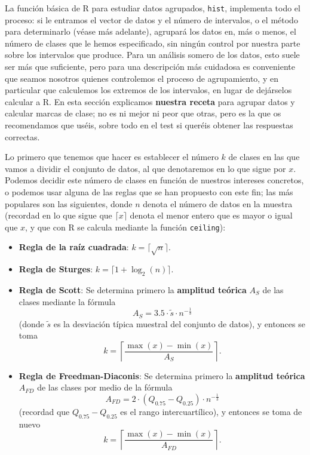 \documentclass[]{book}
\theoremstyle{definition}
\theoremstyle{definition}
\theoremstyle{definition}
\theoremstyle{remark}
\begin{document}
La función básica de R para estudiar datos agrupados, \texttt{hist}, implementa todo el proceso: si le entramos el vector de datos y el número de intervalos, o el método para determinarlo (véase más adelante), agrupará los datos en, más o menos, el número de clases que le hemos especificado, sin ningún control por nuestra parte sobre los intervalos que produce. Para un análisis somero de los datos, esto suele ser más que suficiente, pero para una descripción más cuidadosa es conveniente que seamos nosotros quienes controlemos el proceso de agrupamiento, y en particular que calculemos los extremos de los intervalos, en lugar de dejárselos calcular a R.
En esta sección explicamos \textbf{nuestra receta} para agrupar datos y calcular marcas de clase; no es ni mejor ni peor que otras, pero es la que os recomendamos que uséis, sobre todo en el test si queréis obtener las respuestas correctas.

Lo primero que tenemos que hacer es establecer el número \(k\) de clases en las que vamos a dividir el conjunto de datos, al que denotaremos en lo que sigue por \(x\). Podemos decidir este número de clases en función de nuestros intereses concretos, o podemos usar alguna de las reglas que se han propuesto con este fin; las más populares son las siguientes, donde \(n\) denota el número de datos en la muestra (recordad en lo que sigue que \(\lceil x \rceil\) denota el menor entero que es mayor o igual que \(x\), y que con R se calcula mediante la función \texttt{ceiling}):

\begin{itemize}
\item
  \textbf{Regla de la raíz cuadrada}: \(k=\big\lceil \sqrt{n}\big\rceil\).
\item
  \textbf{Regla de Sturges}: \(k= \big\lceil 1+\log_{2}(n)\big\rceil.\)
\item
  \textbf{Regla de Scott}: Se determina primero la \textbf{amplitud teórica} \(A_S\) de las clases mediante la fórmula
  \[
  A_S= 3.5\cdot \widetilde{s}\cdot n^{-\frac{1}{3}}
  \]
  (donde \(\widetilde{s}\) es la desviación típica muestral del conjunto de datos), y entonces se toma
  \[
  k=\left\lceil
  \frac{\max(x) -\min(x)}{A_S}\right\rceil.
  \]
\item
  \textbf{Regla de Freedman-Diaconis}: Se determina primero la \textbf{amplitud teórica} \(A_{FD}\) de las clases por medio de la fórmula
  \[
  A_{FD}= 2 \cdot (Q_{0.75}-Q_{0.25}) \cdot n^{-\frac{1}{3}}
  \]
  (recordad que \(Q_{0.75}-Q_{0.25}\) es el rango intercuartílico), y entonces se toma de nuevo
  \[
  k= \left\lceil \frac{\max(x) -\min(x)}{A_{FD}}\right\rceil.
  \]
\end{itemize}
\end{document}
